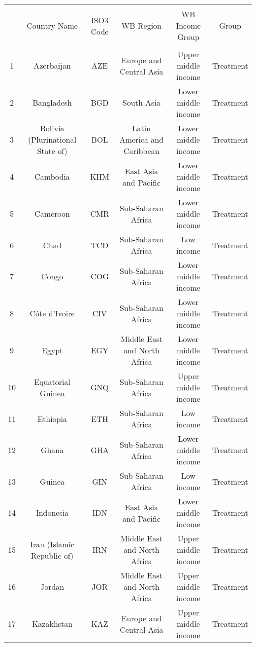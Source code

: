 
\begin{table}[!htbp] \centering 
  \caption{} 
  \label{} 
\begin{tabular}{@{\extracolsep{5pt}} cccccc} 
\\[-1.8ex]\hline 
\hline \\[-1.8ex] 
 & Country Name & ISO3 Code & WB Region & WB Income Group & Group \\ 
\hline \\[-1.8ex] 
1 & Azerbaijan & AZE & Europe and Central Asia & Upper middle income & Treatment \\ 
2 & Bangladesh & BGD & South Asia & Lower middle income & Treatment \\ 
3 & Bolivia (Plurinational State of) & BOL & Latin America and Caribbean & Lower middle income & Treatment \\ 
4 & Cambodia & KHM & East Asia and Pacific & Lower middle income & Treatment \\ 
5 & Cameroon & CMR & Sub-Saharan Africa & Lower middle income & Treatment \\ 
6 & Chad & TCD & Sub-Saharan Africa & Low income & Treatment \\ 
7 & Congo & COG & Sub-Saharan Africa & Lower middle income & Treatment \\ 
8 & Côte d’Ivoire & CIV & Sub-Saharan Africa & Lower middle income & Treatment \\ 
9 & Egypt & EGY & Middle East and North Africa & Lower middle income & Treatment \\ 
10 & Equatorial Guinea & GNQ & Sub-Saharan Africa & Upper middle income & Treatment \\ 
11 & Ethiopia & ETH & Sub-Saharan Africa & Low income & Treatment \\ 
12 & Ghana & GHA & Sub-Saharan Africa & Lower middle income & Treatment \\ 
13 & Guinea & GIN & Sub-Saharan Africa & Low income & Treatment \\ 
14 & Indonesia & IDN & East Asia and Pacific & Lower middle income & Treatment \\ 
15 & Iran (Islamic Republic of) & IRN & Middle East and North Africa & Upper middle income & Treatment \\ 
16 & Jordan & JOR & Middle East and North Africa & Upper middle income & Treatment \\ 
17 & Kazakhstan & KAZ & Europe and Central Asia & Upper middle income & Treatment \\ 

\end{tabular}
\end{table}
